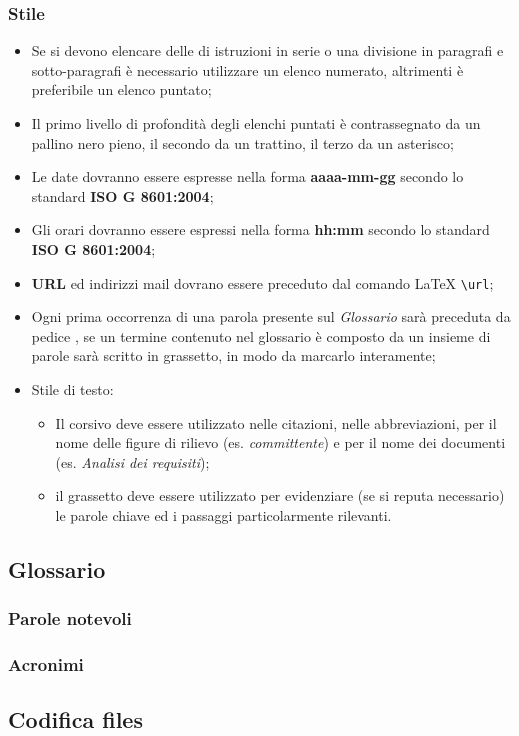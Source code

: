 \subsubsection{Stile}
\begin{itemize}
\item Se si devono elencare delle di istruzioni in serie o una divisione in paragrafi e sotto-paragrafi è necessario utilizzare un elenco numerato, altrimenti è preferibile un elenco puntato;

\item Il primo livello di profondità degli elenchi puntati è contrassegnato da un pallino nero pieno, il secondo da un trattino, il terzo da un asterisco;

\item Le date dovranno essere espresse nella forma \textbf{aaaa-mm-gg} secondo lo standard  \textbf{ISO G 8601:2004};

\item Gli orari dovranno essere espressi nella forma \textbf{hh:mm} secondo lo standard \textbf{ISO G 8601:2004};

\item \textbf{URL} ed indirizzi mail dovrano essere preceduto dal comando \LaTeX{} \verb!\url!;

\item Ogni prima occorrenza di una parola presente sul \textit{Glossario} sarà preceduta da pedice , se un termine contenuto nel glossario è composto da un insieme di parole sarà scritto in grassetto, in modo da marcarlo interamente;

\item Stile di testo:

\begin{itemize}

\item Il corsivo deve essere utilizzato nelle citazioni, nelle abbreviazioni, per il nome delle figure di rilievo (es. \textit{committente}) e per il nome dei documenti (es. \textit{Analisi dei requisiti});

\item il grassetto deve essere utilizzato per evidenziare (se si reputa necessario) le parole chiave ed i passaggi particolarmente rilevanti.

\end{itemize}

\end{itemize}

\subsection{Glossario}
\subsubsection{Parole notevoli}
\subsubsection{Acronimi}
\subsection{Codifica files}
